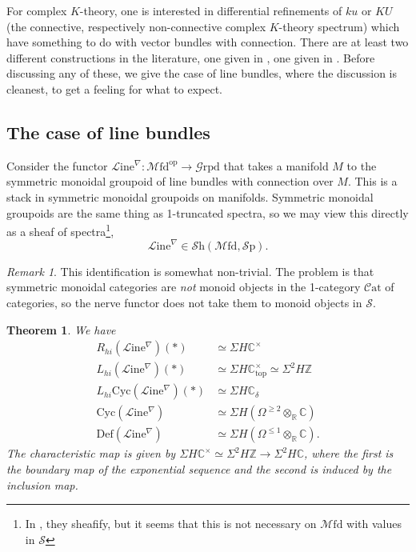 \documentclass[a4paper]{book}
\newcommand{\lC}{\mathcal{C}}
\newcommand{\bC}{\mathbb{C}}
\newcommand{\lG}{\mathcal{G}}
\newcommand{\lL}{\mathcal{L}}
\newcommand{\lM}{\mathcal{M}}
\newcommand{\bR}{\mathbb{R}}
\newcommand{\lS}{\mathcal{S}}
\newcommand{\bZ}{\mathbb{Z}}
\newcommand{\Grpd}{\lG\mathrm{rpd}} %
\newcommand{\cat}{\lC\mathrm{at}} %
\newcommand{\Shv}{\lS\mathrm{h}} %
\newcommand{\Sp}{\lS\mathrm{p}} %
\renewcommand{\Line}{\lL\mathrm{ine}} %
\newcommand{\Mfd}{\lM\mathrm{fd}} %
\newtheorem{theorem}[equation]{Theorem}
\theoremstyle{definition}
\theoremstyle{remark}
\newtheorem{remark}[equation]{Remark}
\numberwithin{equation}{section}
\begin{document}
For complex $K$-theory, one is interested in differential refinements of $ku$ or $KU$ (the connective, respectively non-connective complex $K$-theory spectrum) which have something to do with vector bundles with connection. There are at least two different constructions in the literature, one given in \cite{hopkinssinger2005diffcoh}, one given in \cite{bunkenikolausvoelkl2016diffcoh}. Before discussing any of these, we give the case of line bundles, where the discussion is cleanest, to get a feeling for what to expect.

\subsection{The case of line bundles}
Consider the functor $\Line^\nabla : \Mfd^{\mathrm{op}} \to \Grpd$ that takes a manifold $M$ to the symmetric monoidal groupoid of line bundles with connection over $M$. This is a stack in symmetric monoidal groupoids on manifolds. Symmetric monoidal groupoids are the same thing as 1-truncated spectra, so we may view this directly as a sheaf of spectra\footnote{In \cite[Eq.~(39)]{bunkenikolausvoelkl2016diffcoh}, they sheafify, but it seems that this is not necessary on $\Mfd$ with values in $\lS$},
\[
\Line^\nabla \in \Shv(\Mfd, \Sp).
\]

\begin{remark}
\label{RemComMon}
This identification is somewhat non-trivial. The problem is that symmetric monoidal categories are \emph{not} monoid objects in the 1-category $\cat$ of categories, so the nerve functor does not take them to monoid objects in $\lS$.
\end{remark}

\begin{theorem}
We have
\begin{align*}
R_{hi}(\Line^\nabla)(*) 
&\simeq \Sigma H\bC^\times
\\
L_{hi}(\Line^\nabla)(*) &\simeq \Sigma H\bC^\times_{\mathrm{top}} 
\simeq \Sigma^2 H\bZ
\\
L_{hi}\mathrm{Cyc}(\Line^\nabla)(*) &\simeq \Sigma H\bC_\delta
\\
\mathrm{Cyc}(\Line^\nabla) &\simeq \Sigma H(\Omega^{\geq 2} \otimes_\bR \bC)
\\
\mathrm{Def}(\Line^\nabla) &\simeq \Sigma H(\Omega^{\leq 1} \otimes_\bR \bC ).
\end{align*}
The characteristic map is given by $\Sigma H\bC^\times \simeq \Sigma^2 H\bZ \to \Sigma^2 H \bC$, where the first is the boundary map of the exponential sequence and the second is induced by the inclusion map.
\end{theorem}
\end{document}
